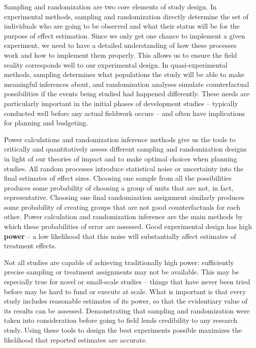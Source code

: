 
\begin{fullwidth}
Sampling and randomization are two core elements of study design.
In experimental methods, sampling and randomization directly determine
the set of individuals who are going to be observed
and what their status will be for the purpose of effect estimation.
Since we only get one chance to implement a given experiment,
we need to have a detailed understanding of how these processes work
and how to implement them properly.
This allows us to ensure the field reality corresponds well to our experimental design.
In quasi-experimental methods,
sampling determines what populations the study
will be able to make meaningful inferences about,
and randomization analyses simulate counterfactual possibilities
if the events being studied had happened differently.
These needs are particularly important in the initial phases of development studies --
typically conducted well before any actual fieldwork occurs --
and often have implications for planning and budgeting.

Power calculations and randomization inference methods
give us the tools to critically and quantitatively assess different
sampling and randomization designs in light of our theories of impact
and to make optimal choices when planning studies.
All random processes introduce statistical noise
or uncertainty into the final estimates of effect sizes.
Choosing one sample from all the possibilities produces some probability of
choosing a group of units that are not, in fact, representative.
Choosing one final randomization assignment similarly produces some probability of
creating groups that are not good counterfactuals for each other.
Power calculation and randomization inference
are the main methods by which these probabilities of error are assessed.
Good experimental design has high \textbf{power} -- a low likelihood that this noise
will substantially affect estimates of treatment effects.

Not all studies are capable of achieving traditionally high power:
sufficiently precise sampling or treatment assignments may not be available.
This may be especially true for novel or small-scale studies --
things that have never been tried before may be hard to fund or execute at scale.
What is important is that every study includes reasonable estimates of its power,
so that the evidentiary value of its results can be assessed.
Demonstrating that sampling and randomization were taken into consideration
before going to field lends credibility to any research study.
Using these tools to design the best experiments possible
maximizes the likelihood that reported estimates are accurate.
\end{fullwidth}

